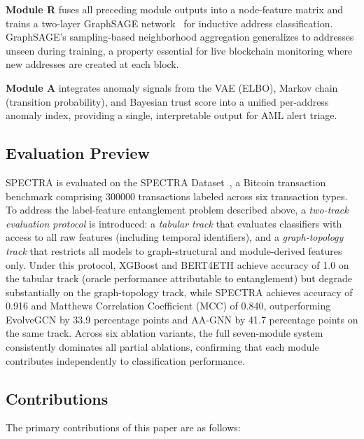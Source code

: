\documentclass[journal]{IEEEtran}
\newcommand{\spectra}{\textsc{SPECTRA}}
\begin{document}
\textbf{Module R} fuses all preceding module outputs into a node-feature
matrix and trains a two-layer GraphSAGE network~\cite{Hamilton2017} for
inductive address classification.
GraphSAGE's sampling-based neighborhood aggregation generalizes to addresses
unseen during training, a property essential for live blockchain monitoring
where new addresses are created at each block.

\textbf{Module A} integrates anomaly signals from the VAE (ELBO), Markov
chain (transition probability), and Bayesian trust score into a unified
per-address anomaly index, providing a single, interpretable output for
AML alert triage.

\subsection*{Evaluation Preview}

\spectra{} is evaluated on the SPECTRA Dataset~\cite{Korde2026Dataset}, a
Bitcoin transaction benchmark comprising \num{300000} transactions labeled
across six transaction types.
To address the label-feature entanglement problem described above, a
\emph{two-track evaluation protocol} is introduced: a \emph{tabular track}
that evaluates classifiers with access to all raw features (including temporal
identifiers), and a \emph{graph-topology track} that restricts all models
to graph-structural and module-derived features only.
Under this protocol, XGBoost and BERT4ETH achieve accuracy of \num{1.0} on
the tabular track (oracle performance attributable to entanglement) but
degrade substantially on the graph-topology track, while \spectra{} achieves
accuracy of \num{0.916} and Matthews Correlation Coefficient (MCC) of
\num{0.840}, outperforming EvolveGCN by \num{33.9} percentage points and
AA-GNN by \num{41.7} percentage points on the same track.
Across six ablation variants, the full seven-module system consistently
dominates all partial ablations, confirming that each module contributes
independently to classification performance.

\subsection*{Contributions}

The primary contributions of this paper are as follows:
\end{document}
